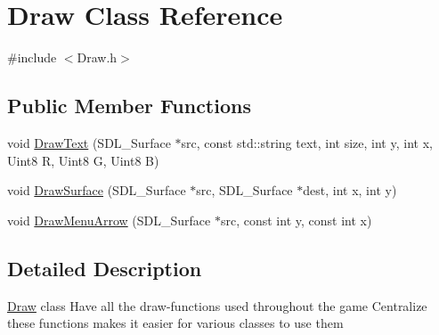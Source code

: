 \hypertarget{class_draw}{\section{\-Draw \-Class \-Reference}
\label{class_draw}
}


{\ttfamily \#include $<$\-Draw.\-h$>$}

\subsection*{\-Public \-Member \-Functions}
\begin{DoxyCompactItemize}
\item 
void \hyperlink{class_draw_a58a62126f5c358bd743f0ea3c825adb4}{\-Draw\-Text} (\-S\-D\-L\-\_\-\-Surface $\ast$src, const std\-::string text, int size, int y, int x, \-Uint8 \-R, \-Uint8 \-G, \-Uint8 \-B)
\item 
void \hyperlink{class_draw_a2196313cba8acb5f69250438c906090c}{\-Draw\-Surface} (\-S\-D\-L\-\_\-\-Surface $\ast$src, \-S\-D\-L\-\_\-\-Surface $\ast$dest, int x, int y)
\item 
void \hyperlink{class_draw_a1625deff3021c6324bdd890f236eaa65}{\-Draw\-Menu\-Arrow} (\-S\-D\-L\-\_\-\-Surface $\ast$src, const int y, const int x)
\end{DoxyCompactItemize}


\subsection{\-Detailed \-Description}
\hyperlink{class_draw}{\-Draw} class \-Have all the draw-\/functions used throughout the game \-Centralize these functions makes it easier for various classes to use them 

